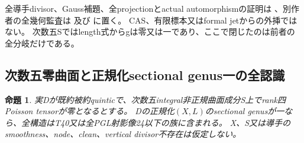 \documentclass[a4paper,11pt]{ltjsarticle}
\newtheorem{proposition}{命題}[section]
\theoremstyle{definition}
\begin{document}
全導手divisor、Gauss補題、全projectionとactual automorphismの証明は
、別作者の全幾何監査は
及び
に置く。
CAS、有限標本又はformal jetからの外挿ではない。
次数五Sではlength式からgは零又は一であり、ここで閉じたのは前者の全分岐だけである。

\subsection{次数五零曲面と正規化sectional genus一の全認識}
\begin{proposition}\label{prop:quintic-rankzero-genusone-G}
実Dが既約被約quinticで、次数五integral非正規曲面成分S上でrank四Poisson tensorが零となるとする。
Dの正規化$(X,L)$のsectional genusが一なら、全構造はT40又は全PGL射影像24以下の族に含まれる。
X、S又は導手のsmoothness、node、clean、vertical divisor不存在は仮定しない。
\end{proposition}
\end{document}
